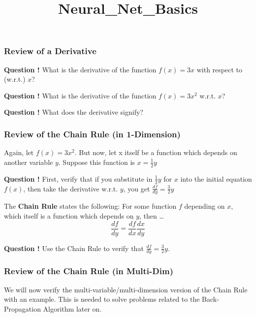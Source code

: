 \documentclass[
]{article}
\title{Neural\_Net\_Basics}
\author{}
\date{\vspace{-2.5em}}
\begin{document}
\maketitle

\hypertarget{review-of-a-derivative}{%
\subsubsection{Review of a Derivative}\label{review-of-a-derivative}}

\textbf{Question !} What is the derivative of the function \(f(x) = 3x\)
with respect to (w.r.t.) \(x\)?

\textbf{Question !} What is the derivative of the function
\(f(x) = 3x^2\) w.r.t. \(x\)?

\textbf{Question !} What does the derivative signify?

\hypertarget{review-of-the-chain-rule-in-1-dimension}{%
\subsubsection{Review of the Chain Rule (in
1-Dimension)}\label{review-of-the-chain-rule-in-1-dimension}}

Again, let \(f(x) = 3x^2\). But now, let x itself be a function which
depends on another variable \(y\). Suppose this function is
\(x = \frac{1}{2}y\)

\textbf{Question !} First, verify that if you substitute in
\(\frac{1}{2}y\) for \(x\) into the initial equation \(f(x)\), then take
the derivative w.r.t. \(y\), you get \(\frac{df}{dy} = \frac{3}{2}y\)

The \textbf{Chain Rule} states the following: For some function \(f\)
depending on \(x\), which itself is a function which depends on \(y\),
then \ldots{} \[ 
\frac{df}{dy} = \frac{df}{dx} \frac{dx}{dy}
\]

\textbf{Question !} Use the Chain Rule to verify that
\(\frac{df}{dy} = \frac{3}{2}y\).

\hypertarget{review-of-the-chain-rule-in-multi-dim}{%
\subsubsection{Review of the Chain Rule (in
Multi-Dim)}\label{review-of-the-chain-rule-in-multi-dim}}

We will now verify the multi-variable/multi-dimension version of the
Chain Rule with an example. This is needed to solve problems related to
the Back-Propagation Algorithm later on.
\end{document}
